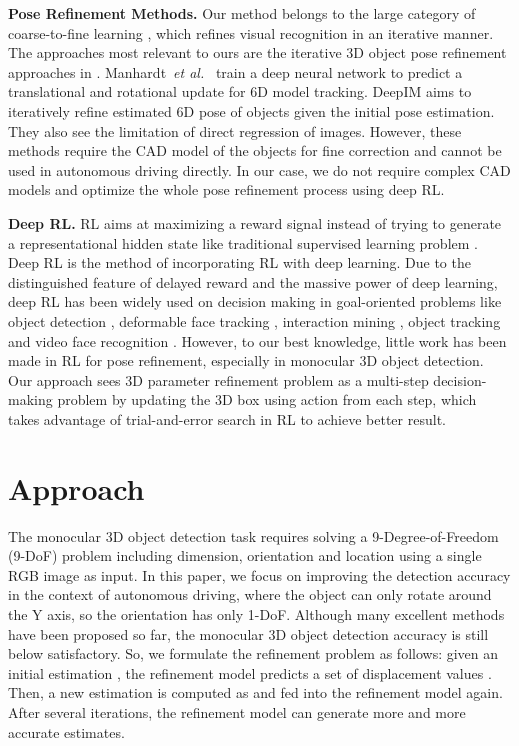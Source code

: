 \documentclass[runningheads]{llncs}
\begin{document}
\noindent
\textbf{Pose Refinement Methods.}
Our method belongs to the large category of coarse-to-fine learning \cite{cao2015look,yoo2015attentionnet,yu2018recurrent}, which refines visual recognition in an iterative manner. The approaches most relevant to ours are the iterative 3D object pose refinement approaches in \cite{manhardt2018deep,li2018deepim}. Manhardt~\emph{et al.}~\cite{manhardt2018deep} train a deep neural network to predict a translational and rotational update for 6D model tracking. DeepIM \cite{li2018deepim} aims to iteratively refine estimated 6D pose of objects given the initial pose estimation. They also see the limitation of direct regression of images. However, these methods require the CAD model of the objects for fine correction and cannot be used in autonomous driving directly. In our case, we do not require complex CAD models and optimize the whole pose refinement process using deep RL.

\noindent
\textbf{Deep RL.}
RL aims at maximizing a reward signal instead of trying to generate a representational hidden state like traditional supervised learning problem \cite{littman2015reinforcement,mnih2015human,sutton2018reinforcement}.
Deep RL is the method of incorporating RL with deep learning. Due to the distinguished feature of delayed reward and the massive power of deep learning, deep RL has been widely used on decision making in goal-oriented problems like object detection \cite{caicedo2015active,mathe2016reinforcement}, deformable face tracking \cite{guo2018dual}, interaction mining \cite{duan2018graphbit}, object tracking \cite{yun2017action,ren2018deep} and video face recognition \cite{rao2017attention}. However, to our best knowledge, little work has been made in RL for pose refinement, especially in monocular 3D object detection. Our approach sees 3D parameter refinement problem as a multi-step decision-making problem by updating the 3D box using action from each step, which takes advantage of trial-and-error search in RL to achieve better result.

\section{Approach}

The monocular 3D object detection task requires solving a 9-Degree-of-Freedom (9-DoF) problem including dimension, orientation and location using a single RGB image as input. In this paper, we focus on improving the detection accuracy in the context of autonomous driving, where the object can only rotate around the Y axis, so the orientation has only 1-DoF. Although many excellent methods have been proposed so far, the monocular 3D object detection accuracy is still below satisfactory. So, we formulate the refinement problem as follows: given an initial estimation , the refinement model predicts a set of displacement values . Then, a new estimation is computed as  and fed into the refinement model again. After several iterations, the refinement model can generate more and more accurate estimates.
\end{document}
